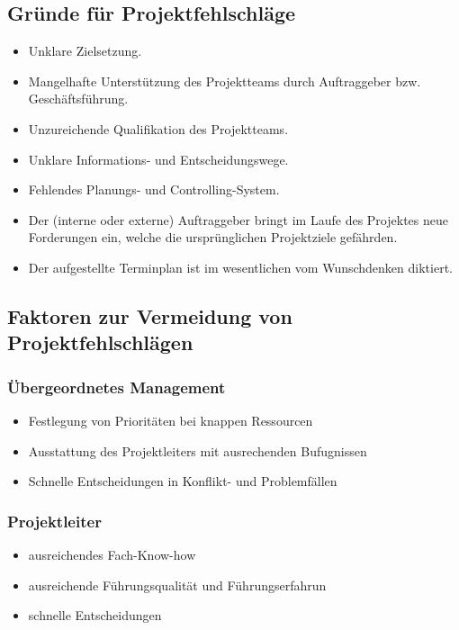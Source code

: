 \documentclass[11pt,a4paper]{article}
\begin{document}
\subsection{Gründe für Projektfehlschläge}

\begin{itemize}
\item Unklare Zielsetzung.
\item Mangelhafte Unterstützung des Projektteams durch Auftraggeber bzw.
Geschäftsführung.
\item Unzureichende Qualifikation des Projektteams.
\item Unklare Informations- und Entscheidungswege.
\item Fehlendes Planungs- und Controlling-System.
\item Der (interne oder externe) Auftraggeber bringt im Laufe des Projektes neue
Forderungen ein, welche die ursprünglichen Projektziele gefährden.
\item Der aufgestellte Terminplan ist im wesentlichen vom Wunschdenken diktiert.
\end{itemize}

\subsection{Faktoren zur Vermeidung von Projektfehlschlägen}

\subsubsection{Übergeordnetes Management}
\begin{itemize}
\item Festlegung von Prioritäten bei knappen Ressourcen
\item Ausstattung des Projektleiters mit ausrechenden Bufugnissen
\item Schnelle Entscheidungen in Konflikt- und Problemfällen
\end{itemize}

\subsubsection{Projektleiter}

\begin{itemize}
\item ausreichendes Fach-Know-how
\item ausreichende Führungsqualität und Führungserfahrun
\item schnelle Entscheidungen
\end{itemize}
\end{document}
